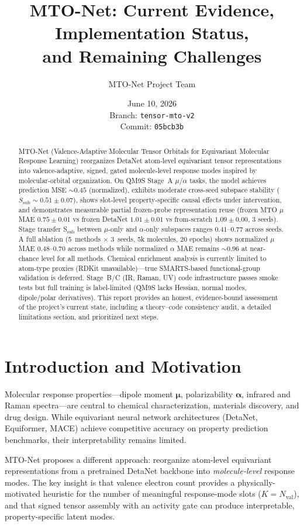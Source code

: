 \documentclass[11pt,a4paper]{article}
\title{\textbf{MTO-Net: Current Evidence, Implementation Status, \\and Remaining Challenges}}
\author{MTO-Net Project Team}
\date{June 10, 2026 \\ Branch: \texttt{tensor-mto-v2} \\ Commit: \texttt{05bcb3b}}
\begin{document}
\maketitle

\begin{abstract}
MTO-Net (Valence-Adaptive Molecular Tensor Orbitals for Equivariant Molecular Response Learning) reorganizes DetaNet atom-level equivariant tensor representations into valence-adaptive, signed, gated molecule-level response modes inspired by molecular-orbital organization. On QM9S Stage~A $\mu$/$\alpha$ tasks, the model achieves prediction MSE $\sim0.45$ (normalized), exhibits moderate cross-seed subspace stability ($S_\text{sub}\sim0.51 \pm 0.07$), shows slot-level property-specific causal effects under intervention, and demonstrates measurable partial frozen-probe representation reuse (frozen MTO $\mu$ MAE $0.75 \pm 0.01$ vs frozen DetaNet $1.01 \pm 0.01$ vs from-scratch $1.09 \pm 0.00$, 3 seeds). Stage transfer S$_\text{sub}$ between $\mu$-only and $\alpha$-only subspaces ranges $0.41$--$0.77$ across seeds. A full ablation (5~methods $\times$ 3~seeds, 5k molecules, 20 epochs) shows normalized $\mu$ MAE $0.48$--$0.70$ across methods while normalized $\alpha$ MAE remains $\sim0.96$ at near-chance level for all methods. Chemical enrichment analysis is currently limited to atom-type proxies (RDKit unavailable)---true SMARTS-based functional-group validation is deferred. Stage~B/C (IR, Raman, UV) code infrastructure passes smoke tests but full training is label-limited (QM9S lacks Hessian, normal modes, dipole/polar derivatives). This report provides an honest, evidence-bound assessment of the project's current state, including a theory--code consistency audit, a detailed limitations section, and prioritized next steps.
\end{abstract}

\section{Introduction and Motivation}
Molecular response properties---dipole moment $\boldsymbol{\mu}$, polarizability $\boldsymbol{\alpha}$, infrared and Raman spectra---are central to chemical characterization, materials discovery, and drug design. While equivariant neural network architectures (DetaNet, Equiformer, MACE) achieve competitive accuracy on property prediction benchmarks, their interpretability remains limited.

MTO-Net proposes a different approach: reorganize atom-level equivariant representations from a pretrained DetaNet backbone into \textit{molecule-level} response modes. The key insight is that valence electron count provides a physically-motivated heuristic for the number of meaningful response-mode slots ($K = N_\text{val}$), and that signed tensor assembly with an activity gate can produce interpretable, property-specific latent modes.
\end{document}

